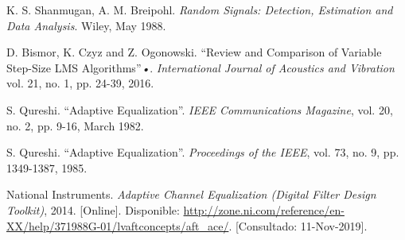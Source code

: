 \documentclass[main.tex]{subfiles}
\begin{document}
\begin{thebibliography}{00}
    K. S. Shanmugan, A. M. Breipohl.
    \textit{Random Signals: Detection, Estimation and Data Analysis}.
    Wiley, May 1988.

    D. Bismor, K. Czyz and Z. Ogonowski. ``Review and Comparison of Variable Step-Size LMS Algorithms''\textsl{•}. 
    \textit{International Journal of Acoustics and Vibration} vol. 21, no. 1, pp. 24-39, 2016.

    S. Qureshi. ``Adaptive Equalization''.
    \textit{IEEE Communications Magazine}, vol. 20, no. 2, pp. 9-16, March 1982.

    S. Qureshi. ``Adaptive Equalization''.
    \textit{Proceedings of the IEEE}, vol. 73, no. 9, pp. 1349-1387, 1985.
    
     National Instruments.
    \textit{Adaptive Channel Equalization (Digital Filter Design Toolkit)}, 2014. [Online]. Disponible: \url{http://zone.ni.com/reference/en-XX/help/371988G-01/lvaftconcepts/aft_ace/}. [Consultado: 11-Nov-2019].

    
\end{thebibliography}
\end{document}
